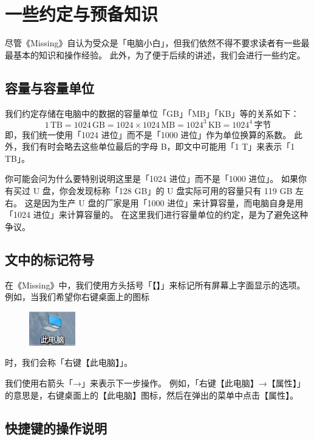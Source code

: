 \setcounter{chapter}{-1}

\chapter{一些约定与预备知识}
\label{first-things-first}

尽管《Missing》自认为受众是「电脑小白」，但我们依然不得不要求读者有一些最最基本的知识和操作经验。
此外，为了便于后续的讲述，我们会进行一些约定。

\section{容量与容量单位}

我们约定存储在电脑中的数据的容量单位「GB」「MB」「KB」等的关系如下：
\[1\,\mathrm{TB}=1024\,\mathrm{GB}=1024\times1024\,\mathrm{MB}=1024^3\,\mathrm{KB}=1024^4\,\text{字节}\]
即，我们统一使用「1024 进位」而不是「1000 进位」作为单位换算的系数。
此外，我们有时会略去这些单位最后的字母 B，即文中可能用「1 T」来表示「1 TB」。

你可能会问为什么要特别说明这里是「1024 进位」而不是「1000 进位」。
如果你有买过 U 盘，你会发现标称「128 GB」的 U 盘实际可用的容量只有 119 GB 左右。
这是因为生产 U 盘的厂家是用「1000 进位」来计算容量，而电脑自身是用「1024 进位」来计算容量的。
在这里我们进行容量单位的约定，是为了避免这种争议。

\section{文中的标记符号}

在《Missing》中，我们使用方头括号「【】」来标记所有屏幕上字面显示的选项。
例如，当我们希望你右键桌面上的图标
\begin{figure}[htb!]
  \centering
  \includegraphics[width=2cm]{assets/This_PC.png}
\end{figure}

\noindent 时，我们会称「右键【此电脑】」。

我们使用右箭头「→」来表示下一步操作。
例如，「右键【此电脑】→【属性】」的意思是，右键桌面上的【此电脑】图标，然后在弹出的菜单中点击【属性】。

\section{快捷键的操作说明}

